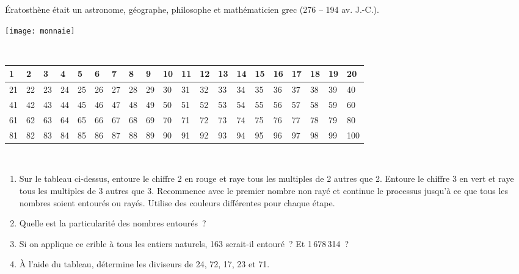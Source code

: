 \begin{activite}

 \begin{minipage}[c]{0.6\textwidth}
Ératosthène était un astronome, géographe, philosophe et mathématicien grec (276 – 194 av. J.-C.).
 \end{minipage} \hfill%
 \begin{minipage}[c]{0.2\textwidth}
  \texttt{[image: monnaie]}
  \end{minipage} \\[1em]
  
\begin{tabularx}{1.01\linewidth}{|X|X|X|X|X|X|X|X|X|X|X|X|X|X|X|X|X|X|X|X|}
     \hline
     1 & 2 & 3 & 4 & 5 & 6 & 7 & 8 & 9 & 10 & 11 & 12 & 13 & 14 & 15 & 16 & 17 & 18 & 19 & 20 \\\hline
     21 & 22 & 23 & 24 & 25 & 26 & 27 & 28 & 29 & 30 & 31 & 32 & 33 & 34 & 35 & 36 & 37 & 38 & 39 & 40 \\\hline
     41 & 42 & 43 & 44 & 45 & 46 & 47 & 48 & 49 & 50 & 51 & 52 & 53 & 54 & 55 & 56 & 57 & 58 & 59 & 60 \\\hline
     61 & 62 & 63 & 64 & 65 & 66 & 67 & 68 & 69 & 70 & 71 & 72 & 73 & 74 & 75 & 76 & 77 & 78 & 79 & 80 \\\hline
     81 & 82 & 83 & 84 & 85 & 86 & 87 & 88 & 89 & 90 & 91 & 92 & 93 & 94 & 95 & 96 & 97 & 98 & 99 & 100 \\\hline
  \end{tabularx} \\
  
\begin{enumerate}             
 \item Sur le tableau ci-dessus, entoure le chiffre 2 en rouge et raye tous les multiples de 2 autres que 2. Entoure le chiffre 3 en vert et raye tous les multiples de 3 autres que 3. Recommence avec le premier nombre non rayé et continue le processus jusqu'à ce que tous les nombres soient entourés ou rayés. Utilise des couleurs différentes pour chaque étape.
 \item Quelle est la particularité des nombres entourés ?
 \item Si on applique ce crible à tous les entiers naturels, 163 serait-il entouré ? Et 1\,678\,314 ?
 \item À l'aide du tableau, détermine les diviseurs de 24, 72, 17, 23 et 71.
 \end{enumerate}

\end{activite}

